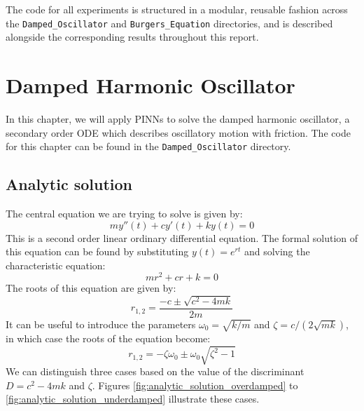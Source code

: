 \documentclass[we,twoside,openright,a4paper,11pt]{uantwerpenbamathesis}
\begin{document}
The code for all experiments is structured in a modular, reusable fashion across the \verb|Damped_Oscillator| and \verb|Burgers_Equation| directories, and is described alongside the corresponding results throughout this report.

\chapter{Damped Harmonic Oscillator}
In this chapter, we will apply PINNs to solve the damped harmonic oscillator, a secondary order ODE which describes oscillatory motion with friction. The code for this chapter can be found in the \verb|Damped_Oscillator| directory.
\section{Analytic solution}
The central equation we are trying to solve is given by:
\begin{equation}\label{eq:damped_harmonic_oscillator}
    my''(t)+cy'(t)+ky(t)=0
\end{equation}
This is a second order linear ordinary differential equation. The formal solution of this equation can be found by substituting $y(t)=e^{rt}$ and solving the characteristic equation:
\begin{equation}\label{eq:damped_harmonic_oscillator_characteristic_equation}
     mr^2+cr+k=0
\end{equation}
The roots of this equation are given by:
\begin{equation}\label{eq:damped_harmonic_oscillator_roots}
    r_{1,2}=\frac{-c\pm\sqrt{c^2-4mk}}{2m}
\end{equation}
It can be useful to introduce the parameters $\omega_0=\sqrt{k/m}$ and $\zeta=c/(2\sqrt{mk})$, in which case the roots of the equation become:
\begin{equation}\label{eq:damped_harmonic_oscillator_roots_normalized}
    r_{1,2}=-\zeta\omega_0\pm\omega_0\sqrt{\zeta^2-1}
\end{equation}
We can distinguish three cases based on the value of the discriminant $D=c^2-4mk$ and $\zeta$. Figures \ref{fig:analytic_solution_overdamped} to \ref{fig:analytic_solution_underdamped} illustrate these cases.\\
\end{document}
